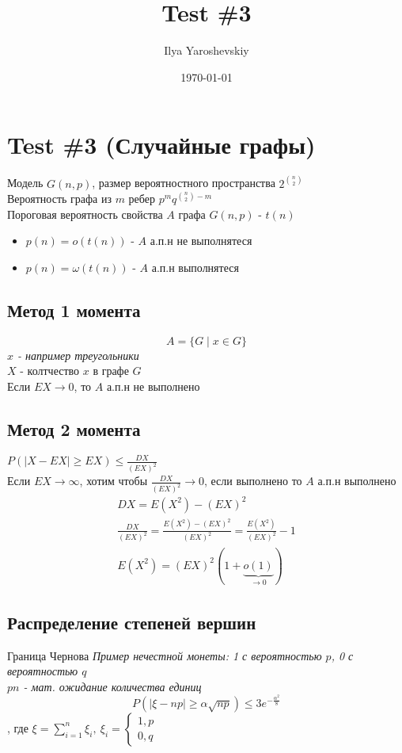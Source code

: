\documentclass{article}
\author{Ilya Yaroshevskiy}
\date{\today}
\title{Test \#3}
\begin{document}
\maketitle
\tableofcontents


\section{Test \#3 (Случайные графы)}
\label{sec:org3eccbd9}
Модель \(G(n, p)\), размер вероятностного пространства \(2^{n \choose 2}\) \\
Вероятность графа из \(m\) ребер \(p^mq^{ {n \choose 2} - m}\) \\
Пороговая вероятность свойства \(A\) графа \(G(n, p)\) - \(t(n)\)
\begin{itemize}
\item \(p(n) = o(t(n))\) - \(A\) а.п.н не выполнятеся
\item \(p(n) = \omega(t(n))\) - \(A\) а.п.н выполнятеся
\end{itemize}
\subsection{Метод 1 момента}
\label{sec:org29010ea}
\[ A = \{G \mid x \in G\} \]
\emph{\(x\) - например треугольники} \\
\(X\) - колтчество \(x\) в графе \(G\) \\
Если \(EX \to 0\), то \(A\) а.п.н не выполнено
\subsection{Метод 2 момента}
\label{sec:org4b3b725}
\(P(|X - EX| \ge EX) \le \frac{DX}{(EX)^2}\) \\
Если \(EX \to \infty\), хотим чтобы \(\frac{DX}{(EX)^2} \to 0\), 
если выполнено то \(A\) а.п.н выполнено
\begin{gather*}
DX = E(X^2) - (EX)^2 \\
\frac{DX}{(EX)^2} = \frac{E(X^2) - (EX)^2}{(EX)^2} = \frac{E(X^2)}{(EX)^2} - 1 \\
E(X^2) = (EX)^2(1 + \underbrace{o(1)}_{\to 0})
\end{gather*}
\subsection{Распределение степеней вершин}
\label{sec:orgdbc0a88}
Граница Чернова
\emph{Пример нечестной монеты: 1 с вероятностью \(p\), 0 с вероятностью \(q\)} \\
\emph{\(pn\) - мат. ожидание количества единиц}
\[ P(|\xi - np| \ge \alpha\sqrt{np}) \le 3e^{-\frac{\alpha^2}{8}} \]
, где \(\xi = \sum_{i=1}^n \xi_i,\ \xi_i = \begin{cases} 1, p \\ 0, q \end{cases}\)
\end{document}
